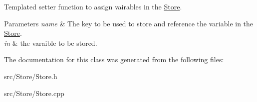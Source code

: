 Templated setter function to assign vairables in the \hyperlink{classStore}{Store}. 
\begin{DoxyParams}{Parameters}
{\em name} & The key to be used to store and reference the variable in the \hyperlink{classStore}{Store}. \\
\hline
{\em in} & the varaible to be stored. \\
\hline
\end{DoxyParams}


The documentation for this class was generated from the following files\-:\begin{DoxyCompactItemize}
\item 
src/\-Store/Store.\-h\item 
src/\-Store/Store.\-cpp\end{DoxyCompactItemize}
